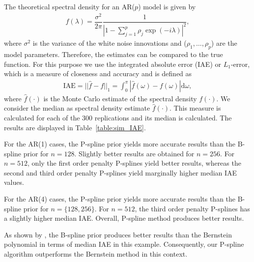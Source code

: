 \documentclass[aps,reprint,amsmath,amssymb,showpacs,showkeys]{revtex4-1}%
\begin{document}
The theoretical spectral density for an AR($p$) model is given by
\begin{align*}
	f(\lambda) = \dfrac{\sigma^2}{2 \pi} \dfrac{1}{|1-\sum_{j=1}^{p}\rho_j \exp(-i \lambda)|^2},
\end{align*}
where $\sigma^2$ is the variance of the white noise innovations and ($\rho_1, \dots, \rho_p$) are the model parameters.  Therefore, the estimates can be compared to the true function.  For this purpose we use the integrated absolute error (IAE) or $L_1$-error, which is a measure of closeness and accuracy and is defined as
\begin{align*}
	\text{IAE} = || \widehat{f} - f ||_1 = \int_{0}^{\pi} |\widehat{f}(\omega)-f(\omega)|\text{d}\omega,
\end{align*}
where $\widehat{f}(\cdot)$ is the Monte Carlo estimate of the spectral density $f(\cdot)$.  We consider the median as spectral density estimate $\widehat{f}(\cdot)$.  This measure is calculated for each of the 300 replications and its median is calculated.  The results are displayed in Table~\ref{table:sim_IAE}.

For the AR(1) cases, the P-spline prior yields more accurate results than the B-spline prior for $n=128$.  Slightly better results are obtained for $n=256$.  For $n=512$, only the first order penalty P-splines yield better results, whereas the second and third order penalty P-splines yield marginally higher median IAE values.

For the AR(4) cases, the P-spline prior yields more accurate results than the B-spline prior for $n=\{128, 256\}$.  For $n=512$, the third order penalty P-splines has a slightly higher median IAE.  Overall, P-spline method produces better results.  

As shown by \cite{Edwards2018}, the B-spline prior produces better results than the Bernstein polynomial in terms of median IAE in this example.  Consequently, our P-spline algorithm outperforms the Bernstein method in this context.
\end{document}

